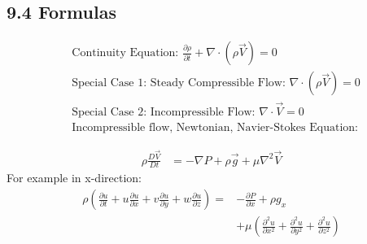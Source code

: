 \subsection*{9.4 Formulas}
\begin{fleqn}
\begin{align*}
    &\text{Continuity Equation: } \frac{\partial \rho}{\partial t} + \nabla \cdot (\rho \vec{V}) = 0 \\
    &\text{Special Case 1: Steady Compressible Flow: } \nabla \cdot (\rho \vec{V}) = 0 \\
    &\text{Special Case 2: Incompressible Flow: } \nabla \cdot \vec{V} = 0 \\
    &\text{Incompressible flow, Newtonian, Navier-Stokes Equation:}
\end{align*}
\end{fleqn}
\begin{align*}
    \rho \frac{ D \vec{V}}{D t}  &= -\nabla P + \rho \vec{g} + \mu \nabla^2 \vec{V} 
\end{align*}
For example in x-direction:
\begin{align*}
    \rho \left(\frac{\partial u}{\partial t} + u \frac{\partial u}{\partial x} + v \frac{\partial u}{\partial y} + w \frac{\partial u}{\partial z}\right) 
    = &-\frac{\partial P}{\partial x} + \rho g_x \\
    &+ \mu \left(\frac{\partial^2 u}{\partial x^2} + \frac{\partial^2 u}{\partial y^2} + \frac{\partial^2 u}{\partial z^2}\right)
\end{align*}